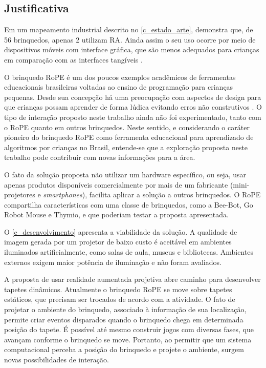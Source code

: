 \subsection{Justificativa}
\label{ss_cintro_justificativa}

Em um mapeamento industrial descrito no \autoref{c_estado_arte}, demonstra que, de 56 brinquedos, apenas 2 utilizam RA. Ainda assim o seu uso ocorre por meio de dispositivos móveis com interface gráfica, que são menos adequados para crianças em comparação com as interfaces tangíveis \cite{sapounidis_tangible_2019, zuckerman_tui_2013}.


O brinquedo RoPE é um dos poucos exemplos acadêmicos de ferramentas educacionais brasileiras voltadas ao ensino de programação para crianças pequenas. Desde sua concepção há uma preocupação com aspectos de design para que crianças possam aprender de forma lúdica evitando erros não construtivos \cite{raabe_brinquedos_2015}. O tipo de interação proposto neste trabalho ainda não foi experimentado, tanto com o RoPE quanto em outros brinquedos. Neste sentido, e considerando o caráter pioneiro do brinquedo RoPE como ferramenta educacional para aprendizado de algoritmos por crianças no Brasil, entende-se que a exploração proposta neste trabalho pode contribuir com novas informações para a área.

O fato da solução proposta não utilizar um hardware específico, ou seja, usar apenas produtos disponíveis comercialmente por mais de um fabricante (mini-projetores e \textit{smartphones}), facilita aplicar a solução a outros brinquedos. O RoPE compartilha características com uma classe de brinquedos, como a Bee-Bot, Go Robot Mouse e Thymio, e que poderiam testar a proposta apresentada.

O \autoref{c_desenvolvimento} apresenta a viabilidade da solução. A qualidade de imagem gerada por um projetor de baixo custo é aceitável em ambientes iluminados artificialmente, como salas de aula, museus e bibliotecas. Ambientes externos exigem maior potência de iluminação e não foram avaliados.

A proposta de usar realidade aumentada projetiva abre caminho para desenvolver tapetes dinâmicos. Atualmente o brinquedo RoPE se move sobre tapetes estáticos, que precisam ser trocados de acordo com a atividade. O fato de projetar o ambiente do brinquedo, associado à informação de sua localização, permite criar eventos disparados quando o brinquedo chega em determinada posição do tapete. É possível até mesmo construir jogos com diversas fases, que avançam conforme o brinquedo se move. Portanto, ao permitir que um sistema computacional perceba a posição do brinquedo e projete o ambiente, surgem novas possibilidades de interação.

